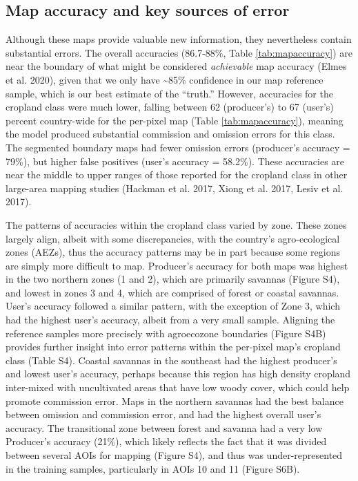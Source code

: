 \documentclass[11pt,a4paper]{article}
\begin{document}
\hypertarget{map-accuracy-and-key-sources-of-error}{%
\subsection{Map accuracy and key sources of
error}\label{map-accuracy-and-key-sources-of-error}}

Although these maps provide valuable new information, they nevertheless
contain substantial errors. The overall accuracies (86.7-88\%, Table
\ref{tab:mapaccuracy}) are near the boundary of what might be considered
\emph{achievable} map accuracy (Elmes et al. 2020), given that we only
have \textasciitilde85\% confidence in our map reference sample, which
is our best estimate of the ``truth.'' However, accuracies for the
cropland class were much lower, falling between 62 (producer's) to 67
(user's) percent country-wide for the per-pixel map (Table
\ref{tab:mapaccuracy}), meaning the model produced substantial
commission and omission errors for this class. The segmented boundary
maps had fewer omission errors (producer's accuracy = 79\%), but higher
false positives (user's accuracy = 58.2\%). These accuracies are near
the middle to upper ranges of those reported for the cropland class in
other large-area mapping studies (Hackman et al. 2017, Xiong et al.
2017, Lesiv et al. 2017).

The patterns of accuracies within the cropland class varied by zone.
These zones largely align, albeit with some discrepancies, with the
country's agro-ecological zones (AEZs), thus the accuracy patterns may
be in part because some regions are simply more difficult to map.
Producer's accuracy for both maps was highest in the two northern zones
(1 and 2), which are primarily savannas (Figure S4), and lowest in zones
3 and 4, which are comprised of forest or coastal savannas. User's
accuracy followed a similar pattern, with the exception of Zone 3, which
had the highest user's accuracy, albeit from a very small sample.
Aligning the reference samples more precisely with agroecozone
boundaries (Figure S4B) provides further insight into error patterns
within the per-pixel map's cropland class (Table S4). Coastal savannas
in the southeast had the highest producer's and lowest user's accuracy,
perhaps because this region has high density cropland inter-mixed with
uncultivated areas that have low woody cover, which could help promote
commission error. Maps in the northern savannas had the best balance
between omission and commission error, and had the highest overall
user's accuracy. The transitional zone between forest and savanna had a
very low Producer's accuracy (21\%), which likely reflects the fact that
it was divided between several AOIs for mapping (Figure S4), and thus
was under-represented in the training samples, particularly in AOIs 10
and 11 (Figure S6B).
\end{document}

